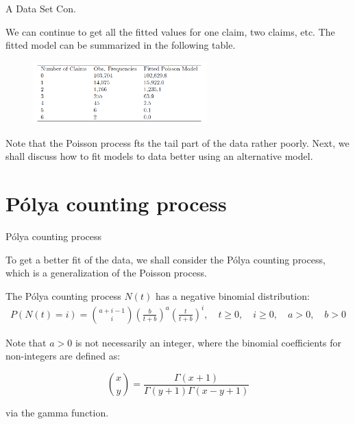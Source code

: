 \documentclass{beamer}
\begin{document}
\begin{frame}{A Data Set Con.}


    {\footnotesize \footnotesize
    \par We can continue to get all the fitted values for one claim, two claims, 
    etc. The fitted model can be summarized in the following table.
    \begin{figure}
    \centering
    \includegraphics[width=0.6\textwidth]{2025-09-08 155325}
    \end{figure}
    \par  \pause Note that the Poisson process fts the tail part of the data rather poorly.
    Next, we shall discuss how to fit models to data better using an alternative
    model.
    }
    
\end{frame}

\section{Pólya counting process}
\begin{frame}{Pólya counting process}

    {\footnotesize \footnotesize
    \par To get a better fit of the data, we shall consider the Pólya counting process,
    which is a generalization of the Poisson process.
    \vspace{1em}

    \par The Pólya counting process $N(t)$ has a negative binomial distribution:
    \begin{align*}
        P(N(t) = i) = \binom{a + i - 1}{i}
         \left( \frac{b}{t + b} \right)^a \left( \frac{t}{t + b} \right)^i, 
         \quad t \geq 0, \quad i \geq 0, \quad a > 0, \quad b > 0
    \end{align*}
    \par  \pause Note that \( a > 0 \) is not necessarily an integer, where the binomial coefficients for non-integers are defined as:

    \[
    \binom{x}{y} = \frac{\Gamma(x + 1)}{\Gamma(y + 1)\Gamma(x - y + 1)}
    \]

    \par via the gamma function.

        }
\end{frame}
\end{document}
